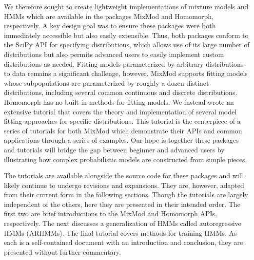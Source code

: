 We therefore sought to create lightweight implementations of mixture models and HMMs which are available in the packages MixMod and Homomorph, respectively. A key design goal was to ensure these packages were both immediately accessible but also easily extensible. Thus, both packages conform to the SciPy API for specifying distributions, which allows use of its large number of distributions but also permits advanced users to easily implement custom distributions as needed. Fitting models parameterized by arbitrary distributions to data remains a significant challenge, however. MixMod supports fitting models whose subpopulations are parameterized by roughly a dozen distinct distributions, including several common continuous and discrete distributions. Homomorph has no built-in methods for fitting models. We instead wrote an extensive tutorial that covers the theory and implementation of several model fitting approaches for specific distributions. This tutorial is the centerpiece of a series of tutorials for both MixMod which demonstrate their APIs and common applications through a series of examples. Our hope is together these packages and tutorials will bridge the gap between beginner and advanced users by illustrating how complex probabilistic models are constructed from simple pieces.

The tutorials are available alongside the source code for these packages and will likely continue to undergo revisions and expansions. They are, however, adapted from their current form in the following sections. Though the tutorials are largely independent of the others, here they are presented in their intended order. The first two are brief introductions to the MixMod and Homomorph APIs, respectively. The next discusses a generalization of HMMs called autoregressive HMMs (ARHMMs). The final tutorial covers methods for training HMMs. As each is a self-contained document with an introduction and conclusion, they are presented without further commentary.

